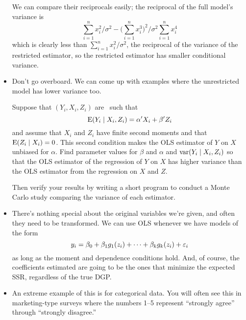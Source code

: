 \begin{itemize}[leftmargin=0pt]
  We can compare their reciprocals easily; the reciprocal of the full
  model's variance is
  \begin{equation*}
    \sum_{i=1}^n x_i^2 / \sigma^2 -
    \big( \sum_{i=1}^n x_i^3 \big)^2 \Big/ \sigma^2 \sum_{i=1}^n x_i^4
  \end{equation*}
  which is clearly less than $\sum_{i=1}^n x_i^2 / \sigma^2$, the
  reciprocal of the variance of the restricted estimator, so the
  restricted estimator has smaller conditional variance.

\item Don't go overboard.  We can come up with examples where the
  unrestricted model has lower variance too.
  \begin{hw}
    Suppose that $(Y_i, X_i, Z_i)$ are \iid\ such that
    \begin{equation*}
      \operatorname{E}(Y_i \mid X_i, Z_i) = \alpha' X_i + \beta' Z_i
    \end{equation*}
    and assume that $X_i$ and $Z_i$ have finite second moments and
    that $\operatorname{E}(Z_i \mid X_i) = 0$.  This second condition makes the OLS
    estimator of $Y$ on $X$ unbiased for $\alpha$.  Find parameter
    values for $\beta$ and $\alpha$ and $\operatorname{var}(Y_i \mid X_i, Z_i)$ so
    that the OLS estimator of the regression of $Y$ on $X$ has higher
    variance than the OLS estimator from the regression on $X$ and
    $Z$.

    Then verify your results by writing a short program to conduct a
    Monte Carlo study comparing the variance of each estimator.
  \end{hw}

\item There's nothing special about the original variables we're
  given, and often they need to be transformed.  We can use OLS
  whenever we have models of the form
  \begin{equation*}
    y_i = \beta_0 + \beta_1 g_1(z_i) + \cdots + \beta_k g_k(z_i) + \varepsilon_i
  \end{equation*}
  as long as the moment and dependence conditions hold.  And, of
  course, the coefficients estimated are going to be the ones that
  minimize the expected SSR, regardless of the true DGP.

\item An extreme example of this is for categorical data.  You will
  often see this in marketing-type surveys where the numbers 1--5
  represent ``strongly agree'' through ``strongly disagree.''


\end{itemize}
